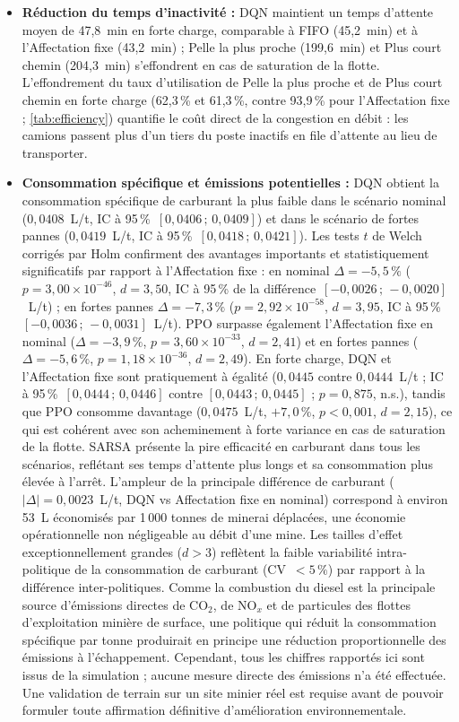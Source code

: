 \documentclass[11pt,a4paper]{article}
\begin{document}
\begin{itemize}
  \item \textbf{Réduction du temps d'inactivité :} DQN maintient un temps d'attente moyen de 47,8~min en forte charge, comparable à FIFO (45,2~min) et à l'Affectation fixe (43,2~min) ; Pelle la plus proche (199,6~min) et Plus court chemin (204,3~min) s'effondrent en cas de saturation de la flotte. L'effondrement du taux d'utilisation de Pelle la plus proche et de Plus court chemin en forte charge (62,3\,\% et 61,3\,\%, contre 93,9\,\% pour l'Affectation fixe ; \cref{tab:efficiency}) quantifie le coût direct de la congestion en débit : les camions passent plus d'un tiers du poste inactifs en file d'attente au lieu de transporter.
  \item \textbf{Consommation spécifique et émissions potentielles :} DQN obtient la consommation spécifique de carburant la plus faible dans le scénario nominal ($0{,}0408$~L/t, IC à 95\,\%~$[0{,}0406\,;\,0{,}0409]$) et dans le scénario de fortes pannes ($0{,}0419$~L/t, IC à 95\,\%~$[0{,}0418\,;\,0{,}0421]$). Les tests $t$ de Welch corrigés par Holm confirment des avantages importants et statistiquement significatifs par rapport à l'Affectation fixe : en nominal $\Delta=-5{,}5\,\%$ ($p=3{,}00\times10^{-46}$, $d=3{,}50$, IC à 95\,\% de la différence~$[-0{,}0026\,;\,-0{,}0020]$~L/t) ; en fortes pannes $\Delta=-7{,}3\,\%$ ($p=2{,}92\times10^{-58}$, $d=3{,}95$, IC à 95\,\%~$[-0{,}0036\,;\,-0{,}0031]$~L/t). PPO surpasse également l'Affectation fixe en nominal ($\Delta=-3{,}9\,\%$, $p=3{,}60\times10^{-33}$, $d=2{,}41$) et en fortes pannes ($\Delta=-5{,}6\,\%$, $p=1{,}18\times10^{-36}$, $d=2{,}49$). En forte charge, DQN et l'Affectation fixe sont pratiquement à égalité ($0{,}0445$ contre $0{,}0444$~L/t ; IC à 95\,\%~$[0{,}0444\,;\,0{,}0446]$ contre $[0{,}0443\,;\,0{,}0445]$ ; $p=0{,}875$, n.s.), tandis que PPO consomme davantage ($0{,}0475$~L/t, $+7{,}0\,\%$, $p<0{,}001$, $d=2{,}15$), ce qui est cohérent avec son acheminement à forte variance en cas de saturation de la flotte. SARSA présente la pire efficacité en carburant dans tous les scénarios, reflétant ses temps d'attente plus longs et sa consommation plus élevée à l'arrêt. L'ampleur de la principale différence de carburant ($|\Delta|=0{,}0023$~L/t, DQN vs Affectation fixe en nominal) correspond à environ 53~L économisés par 1\,000 tonnes de minerai déplacées, une économie opérationnelle non négligeable au débit d'une mine. Les tailles d'effet exceptionnellement grandes ($d>3$) reflètent la faible variabilité intra-politique de la consommation de carburant (CV~$<5\,\%$) par rapport à la différence inter-politiques. Comme la combustion du diesel est la principale source d'émissions directes de CO$_2$, de NO$_x$ et de particules des flottes d'exploitation minière de surface, une politique qui réduit la consommation spécifique par tonne produirait en principe une réduction proportionnelle des émissions à l'échappement. Cependant, tous les chiffres rapportés ici sont issus de la simulation ; aucune mesure directe des émissions n'a été effectuée. Une validation de terrain sur un site minier réel est requise avant de pouvoir formuler toute affirmation définitive d'amélioration environnementale.
\end{itemize}
\end{document}
